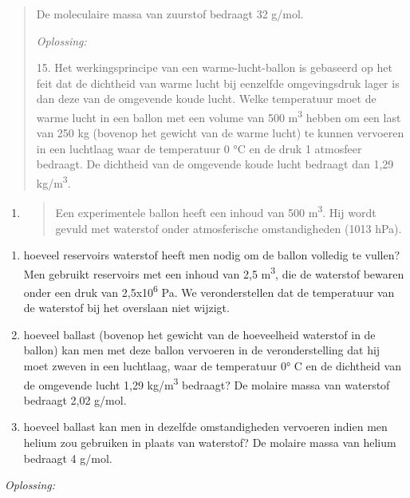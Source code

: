 \documentclass[]{article}
\begin{document}
\begin{quote}
De moleculaire massa van zuurstof bedraagt 32 g/mol.

\emph{Oplossing:}

15. Het werkingsprincipe van een warme-lucht-ballon is gebaseerd op het
feit dat de dichtheid van warme lucht bij eenzelfde omgevingsdruk lager
is dan deze van de omgevende koude lucht. Welke temperatuur moet de
warme lucht in een ballon met een volume van 500 m\textsuperscript{3}
hebben om een last van 250 kg (bovenop het gewicht van de warme lucht)
te kunnen vervoeren in een luchtlaag waar de temperatuur 0 °C en de druk
1 atmosfeer bedraagt. De dichtheid van de omgevende koude lucht bedraagt
dan 1,29 kg/m\textsuperscript{3}.
\end{quote}

\begin{enumerate}
\def\labelenumi{\arabic{enumi}.}
\setcounter{enumi}{15}
\item
  \begin{quote}
  Een experimentele ballon heeft een inhoud van 500
  m\textsuperscript{3}. Hij wordt gevuld met waterstof onder
  atmosferische omstandigheden (1013 hPa).
  \end{quote}
\end{enumerate}

\begin{enumerate}
\def\labelenumi{\alph{enumi}.}
\item
  hoeveel reservoirs waterstof heeft men nodig om de ballon volledig te
  vullen? Men gebruikt reservoirs met een inhoud van 2,5
  m\textsuperscript{3}, die de waterstof bewaren onder een druk van
  2,5x10\textsuperscript{6} Pa. We veronderstellen dat de temperatuur
  van de waterstof bij het overslaan niet wijzigt.
\item
  hoeveel ballast (bovenop het gewicht van de hoeveelheid waterstof in
  de ballon) kan men met deze ballon vervoeren in de veronderstelling
  dat hij moet zweven in een luchtlaag, waar de temperatuur 0° C en de
  dichtheid van de omgevende lucht 1,29 kg/m\textsuperscript{3}
  bedraagt? De molaire massa van waterstof bedraagt 2,02 g/mol.
\item
  hoeveel ballast kan men in dezelfde omstandigheden vervoeren indien
  men helium zou gebruiken in plaats van waterstof? De molaire massa van
  helium bedraagt 4 g/mol.
\end{enumerate}

\emph{Oplossing:}
\end{document}
